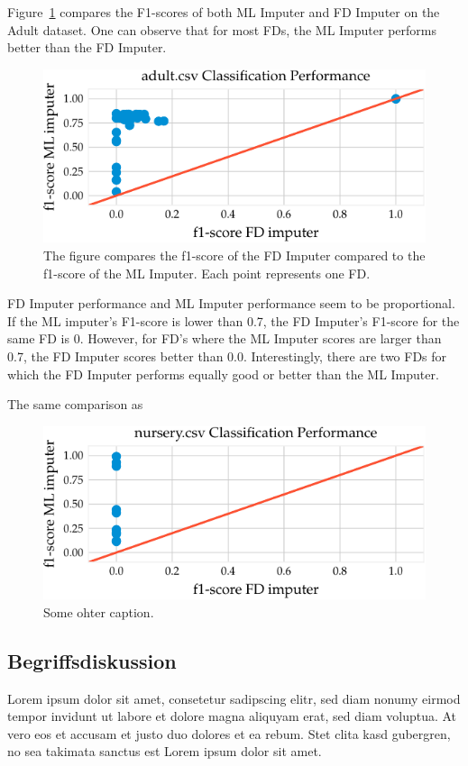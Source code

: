Figure~\ref{fig:f1_ml_fd_adult} compares the F1-scores of both ML Imputer and FD Imputer on the Adult dataset.
One can observe that for most FDs, the ML Imputer performs better than the FD Imputer.
\begin{figure}[h]
     \centering
     \includegraphics[width=.8\textwidth]{../figures/adult/f1_ml_fd_adult}
     \caption{The figure compares the f1-score of the FD Imputer compared to the f1-score of the ML Imputer. Each point represents one FD.}
     \label{fig:f1_ml_fd_adult}
 \end{figure}
FD Imputer performance and ML Imputer performance seem to be proportional.
If the ML imputer's F1-score is lower than 0.7, the FD Imputer's F1-score for the same FD is 0.
However, for FD's where the ML Imputer scores are larger than 0.7, the FD Imputer scores better than 0.0.
Interestingly, there are two FDs for which the FD Imputer performs equally good or better than the ML Imputer.

The same comparison as
 \begin{figure}[h]
     \centering
     \includegraphics[width=.8\textwidth]{../figures/nursery/f1_ml_fd_nursery}
     \caption{Some ohter caption.}
     \label{fig:f1_ml_fd_nursery}
\end{figure}

\subsection{Begriffsdiskussion}
Lorem ipsum dolor sit amet, consetetur sadipscing elitr, sed diam nonumy eirmod
tempor invidunt ut labore et dolore magna aliquyam erat, sed diam voluptua. At
vero eos et accusam et justo duo dolores et ea rebum. Stet clita kasd gubergren,
no sea takimata sanctus est Lorem ipsum dolor sit amet.
